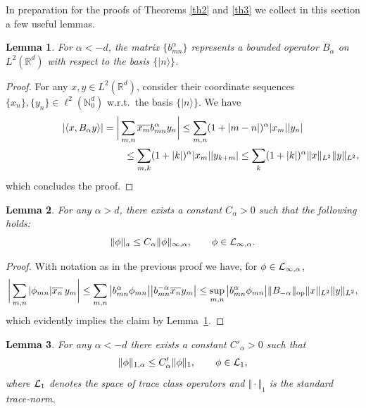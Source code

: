 \documentclass[11pt]{article}
\newtheorem{lemma}{Lemma}
\begin{document}
In preparation for the proofs of Theorems \ref{th2} and \ref{th3} we
collect in this section a few useful lemmas.

\begin{lemma}
\label{Bbounded}
For $\alpha<-d$, the matrix
$\{b_{mn}^\alpha\}$ represents a bounded operator $B_\alpha$ on
$L^2(\mathbb R^d)$ with respect to the basis $\{|n\rangle\}$.
\end{lemma}
\begin{proof}
For any $x,y\in L^2(\mathbb R^d)$, consider their coordinate sequences
$\{x_n\},\{y_n\}\in \ell^2(\mathbb N_0^d)$ w.r.t.\ the basis $\{|n\rangle\}$. We have
\begin{gather*}
\vert\langle x,B_\alpha y\rangle\vert=
\bigg|\sum_{m,n}\overline{x_m} b^\alpha_{mn} y_n\bigg| \leq
\sum_{m,n}(1+|m-n|)^\alpha |x_m| |y_n|\\
\hphantom{\vert\langle x,B_\alpha y\rangle\vert=
\bigg|\sum_{m,n}\overline{x_m} b^\alpha_{mn} y_n\bigg|}{}
\leq\sum_{m,k}(1+|k|)^\alpha |x_m| |y_{k+m}|
\leq\sum_k(1+|k|)^\alpha \Vert x\Vert_{L^2} \Vert y\Vert_{L^2} ,
\end{gather*}
which concludes the proof.
\end{proof}

\begin{lemma}\label{anorm}
For any $\alpha>d$, there exists a constant $C_\alpha>0$ such that the following holds:
\[
\Vert\phi\Vert_a\leq C_\alpha \Vert\phi\Vert_{\infty,\alpha} ,\qquad \phi\in{\cal L}_{\infty,\alpha} .
\]
\end{lemma}

\begin{proof}
With notation as in the previous proof we have, for $\phi\in{\cal L}_{\infty,\alpha}$,
\begin{gather*}
\bigg|\sum_{m,n}|\phi_{mn}| \overline{x_n}\,y_m\bigg| \leq
\sum_{m,n}\big|b^\alpha_{mn} \phi_{mn}\big|
\big|b^{-\alpha}_{mn} \overline{x_n} y_m\big|
\leq \sup_{m,n}\big|b^\alpha_{mn}\phi_{mn}\big|
 \Vert B_{-\alpha}\Vert_{\rm op} \Vert x\Vert_{L^2} \Vert y\Vert_{L^2} ,
\end{gather*}
which evidently implies the claim by Lemma~\ref{Bbounded}.
\end{proof}

\begin{lemma}\label{trace}
For any $\alpha<-d$ there exists a constant $C'_\alpha>0$ such that
\[
\Vert\phi\Vert_{1,\alpha}\leq C'_{\alpha} \Vert\phi\Vert_1 ,\qquad \phi\in{\cal L}_1 ,
\]
where ${\cal L}_1$ denotes the space of trace class operators and
$\Vert\cdot\Vert_1$ is the standard trace-norm.
\end{lemma}
\end{document}
